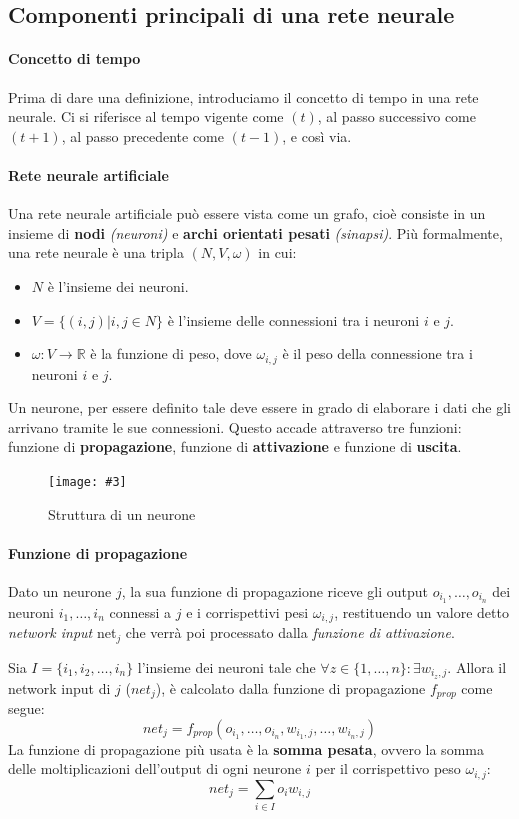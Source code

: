 \documentclass[12pt, twoside, letterpaper]{report}
\newcommand{\img}[4] {
	\begin{figure}[h]
		\caption{#1}
		\centering
		\texttt{[image: \#3]}\\
		\label{#4}
	\end{figure}
}
\begin{document}
		\subsection{Componenti principali di una rete neurale} 
			\paragraph{Concetto di tempo} Prima di dare una definizione, introduciamo il concetto di tempo in una rete neurale. Ci si riferisce al tempo vigente come $(t)$, al passo successivo come $(t+1)$, al passo precedente come $(t-1)$, e così via.
			\paragraph{Rete neurale artificiale}
			Una rete neurale artificiale può essere vista come un grafo, cioè consiste in un insieme di \textbf{nodi} \textit{(neuroni)} e \textbf{archi orientati pesati} \textit{(sinapsi)}. Più formalmente, una rete neurale è una tripla $(N,V, \omega)$ in cui:
			\begin{itemize}
				\item $N$ è l'insieme dei neuroni.
				\item $V = \{(i,j) | i,j \in N\}$ è l'insieme delle connessioni tra i neuroni $i$ e $j$.
				\item $\omega: V \rightarrow \mathbb{R}$ è la funzione di peso, dove $\omega_{i,j}$ è il peso della connessione tra i neuroni $i$ e $j$.
			\end{itemize}
			Un neurone, per essere definito tale deve essere in grado di elaborare i dati che gli arrivano tramite le sue connessioni. Questo accade attraverso tre funzioni: funzione di \textbf{propagazione}, funzione di \textbf{attivazione} e funzione di \textbf{uscita}. 
			
			\img{Struttura di un neurone}{0.4}{neurone.png}{neurone}
			
			 \paragraph{Funzione di propagazione} Dato un neurone $j$, la sua funzione di propagazione riceve gli output $o_{i_1}, \dots, o_{i_n}$ dei neuroni $i_1, \dots, i_n$ connessi a $j$ e i corrispettivi pesi $\omega_{i,j}$, restituendo un valore detto \textit{network input} net$_j$ che verrà poi processato dalla \textit{funzione di attivazione}. 
			 
			 	Sia $I = \{i_1, i_2, \dots, i_n\}$ l'insieme dei neuroni tale che $\forall z \in \{1, \dots, n\} : \exists w_{i_z,j}$. Allora il network input di $j$ ($net_j$), è calcolato dalla funzione di propagazione $f_{prop}$ come segue: $$net_j = f_{prop}(o_{i_1}, \dots, o_{i_n},w_{i_1,j}, \dots, w_{i_n,j})$$
			 	La funzione di propagazione più usata è la \textbf{somma pesata}, ovvero la somma delle moltiplicazioni dell'output di ogni neurone $i$ per il corrispettivo peso $\omega_{i,j}$: $$net_j = \sum_{i \in I} o_i w_{i,j}$$
			 	
\end{document}
